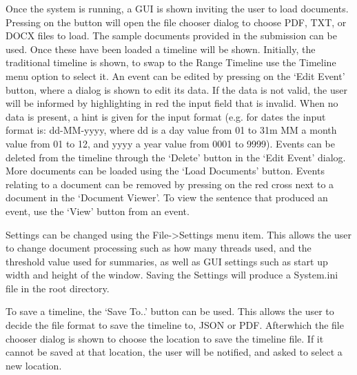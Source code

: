 \par Once the system is running, a GUI is shown inviting the user to load documents. Pressing on the button will open the file chooser dialog to choose PDF, TXT, or DOCX files to load. The sample documents provided in the submission can be used. Once these have been loaded a timeline will be shown. Initially, the traditional timeline is shown, to swap to the Range Timeline use the Timeline menu option to select it. An event can be edited by pressing on the `Edit Event' button, where a dialog is shown to edit its data. If the data is not valid, the user will be informed by highlighting in red the input field that is invalid. When no data is present, a hint is given for the input format (e.g. for dates the input format is: dd-MM-yyyy, where dd is a day value from 01 to 31m MM a month value from 01 to 12, and yyyy a year value from 0001 to 9999). Events can be deleted from the timeline through the `Delete' button in the `Edit Event' dialog. More documents can be loaded using the `Load Documents' button. Events relating to a document can be removed by pressing on the red cross next to a document in the `Document Viewer'. To view the sentence that produced an event, use the `View' button from an event.

\par Settings can be changed using the File->Settings menu item. This allows the user to change document processing such as how many threads used, and the threshold value used for summaries, as well as GUI settings such as start up width and height of the window. Saving the Settings will produce a System.ini file in the root directory.

\par To save a timeline, the `Save To..' button can be used. This allows the user to decide the file format to save the timeline to, JSON or PDF. Afterwhich the file chooser dialog is shown to choose the location to save the timeline file. If it cannot be saved at that location, the user will be notified, and asked to select a new location.